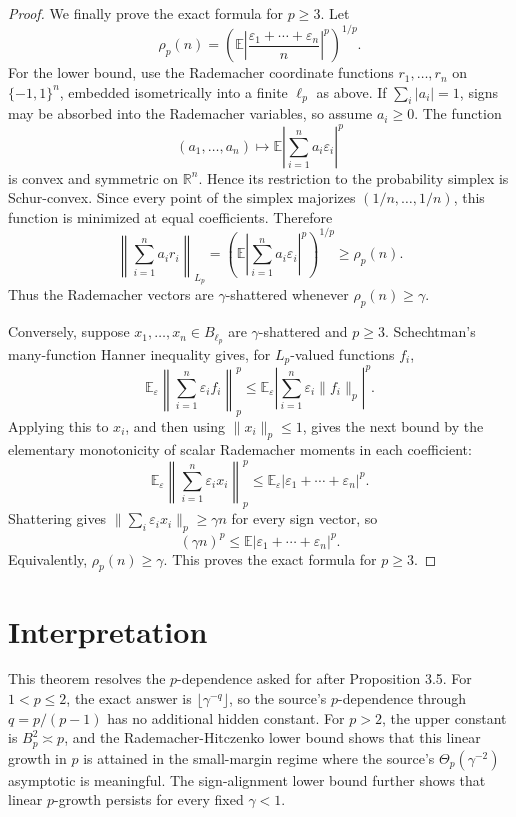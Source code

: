 \documentclass[11pt]{article}
\newcommand{\R}{\mathbb{R}}
\newcommand{\E}{\mathbb{E}}
\newcommand{\rad}{\varepsilon}
\begin{document}
\begin{proof}
We finally prove the exact formula for \(p\ge3\).  Let
\[
  \rho_p(n)
  =
  \left(\E\left|\frac{\rad_1+\cdots+\rad_n}{n}\right|^p\right)^{1/p}.
\]
For the lower bound, use the Rademacher coordinate functions
\(r_1,\ldots,r_n\) on \(\{-1,1\}^n\), embedded isometrically into a finite
\(\ell_p\) as above.  If \(\sum_i |a_i|=1\), signs may be absorbed into the
Rademacher variables, so assume \(a_i\ge0\).  The function
\[
  (a_1,\ldots,a_n)\mapsto
  \E\left|\sum_{i=1}^n a_i\rad_i\right|^p
\]
is convex and symmetric on \(\R^n\).  Hence its restriction to the probability
simplex is Schur-convex.  Since every point of the simplex majorizes
\((1/n,\ldots,1/n)\), this function is minimized at equal coefficients.
Therefore
\[
 \left\|\sum_{i=1}^n a_i r_i\right\|_{L_p}
 =
 \left(\E\left|\sum_{i=1}^n a_i\rad_i\right|^p\right)^{1/p}
 \ge \rho_p(n).
\]
Thus the Rademacher vectors are \(\gamma\)-shattered whenever
\(\rho_p(n)\ge\gamma\).

Conversely, suppose \(x_1,\ldots,x_n\in B_{\ell_p}\) are
\(\gamma\)-shattered and \(p\ge3\).  Schechtman's many-function Hanner
inequality gives, for \(L_p\)-valued functions \(f_i\),
\[
  \E_\rad\left\|\sum_{i=1}^n \rad_i f_i\right\|_p^p
  \le
  \E_\rad\left|\sum_{i=1}^n \rad_i\|f_i\|_p\right|^p .
\]
Applying this to \(x_i\), and then using \(\|x_i\|_p\le1\), gives the next
bound by the elementary monotonicity of scalar Rademacher moments in each
coefficient:
\[
  \E_\rad\left\|\sum_{i=1}^n \rad_i x_i\right\|_p^p
  \le
  \E_\rad|\rad_1+\cdots+\rad_n|^p .
\]
Shattering gives
\(\|\sum_i \rad_i x_i\|_p\ge\gamma n\) for every sign vector, so
\[
  (\gamma n)^p
  \le
  \E|\rad_1+\cdots+\rad_n|^p.
\]
Equivalently, \(\rho_p(n)\ge\gamma\).  This proves the exact formula for
\(p\ge3\).
\end{proof}

\section*{Interpretation}

This theorem resolves the \(p\)-dependence asked for after Proposition 3.5.
For \(1<p\le2\), the exact answer is \(\lfloor\gamma^{-q}\rfloor\), so the
source's \(p\)-dependence through \(q=p/(p-1)\) has no additional hidden
constant.  For \(p>2\), the upper constant is \(B_p^2\asymp p\), and the
Rademacher-Hitczenko lower bound shows that this linear growth in \(p\) is
attained in the small-margin regime where the source's
\(\Theta_p(\gamma^{-2})\) asymptotic is meaningful.  The sign-alignment lower
bound further shows that linear \(p\)-growth persists for every fixed
\(\gamma<1\).
\end{document}
